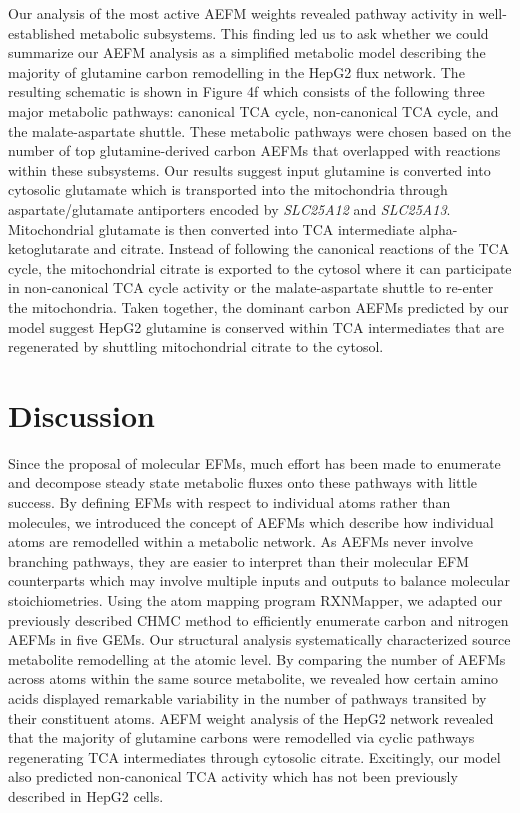 \documentclass[12pt]{article}
\begin{document}

Our analysis of the most active AEFM weights revealed pathway activity in
well-established metabolic subsystems. This finding led us to ask whether
we could summarize our AEFM analysis as a simplified metabolic model
describing the majority of glutamine carbon remodelling in the HepG2 flux
network. The resulting schematic is shown in Figure 4f which consists of
the following three major metabolic pathways: canonical TCA cycle,
non-canonical TCA cycle, and the malate-aspartate shuttle. These metabolic
pathways were chosen based on the number of top glutamine-derived carbon
AEFMs that overlapped with reactions within these subsystems. Our results
suggest input glutamine is converted into cytosolic glutamate which is
transported into the mitochondria through aspartate/glutamate antiporters
encoded by \textit{SLC25A12} and \textit{SLC25A13}. Mitochondrial
glutamate is then converted into TCA intermediate alpha-ketoglutarate and
citrate. Instead of following the canonical reactions of the TCA cycle,
the mitochondrial citrate is exported to the cytosol where it can
participate in non-canonical TCA cycle activity or the malate-aspartate
shuttle to re-enter the mitochondria. Taken together, the dominant carbon
AEFMs predicted by our model suggest HepG2 glutamine is conserved within
TCA intermediates that are regenerated by shuttling mitochondrial citrate
to the cytosol.

\section*{Discussion}

Since the proposal of molecular EFMs, much effort has been made to
enumerate and decompose steady state metabolic fluxes onto these pathways
with little success. By defining EFMs with respect to individual atoms
rather than molecules, we introduced the concept of AEFMs which describe
how individual atoms are remodelled within a metabolic network. As AEFMs
never involve branching pathways, they are easier to interpret than their
molecular EFM counterparts which may involve multiple inputs and outputs
to balance molecular stoichiometries. Using the atom mapping program
RXNMapper, we adapted our previously described CHMC method to efficiently
enumerate carbon and nitrogen AEFMs in five GEMs. Our structural analysis
systematically characterized source metabolite remodelling at the atomic
level. By comparing the number of AEFMs across atoms within the same
source metabolite, we revealed how certain amino acids displayed
remarkable variability in the number of pathways transited by their
constituent atoms. AEFM weight analysis of the HepG2 network revealed that
the majority of glutamine carbons were remodelled via cyclic pathways
regenerating TCA intermediates through cytosolic citrate. Excitingly, our
model also predicted non-canonical TCA activity which has not been
previously described in HepG2 cells.
\end{document}
